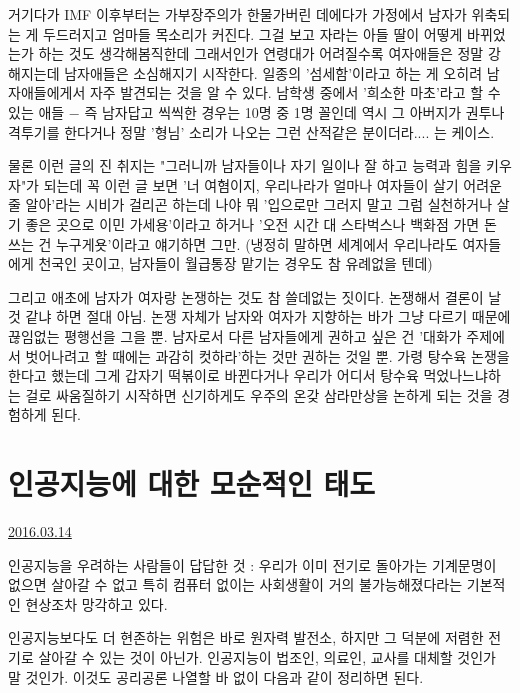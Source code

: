 거기다가 IMF 이후부터는 가부장주의가 한물가버린 데에다가 가정에서 남자가 위축되는 게 두드러지고 엄마들 목소리가 커진다.
그걸 보고 자라는 아들 딸이 어떻게 바뀌었는가 하는 것도 생각해봄직한데
그래서인가 연령대가 어려질수록 여자애들은 정말 강해지는데 남자애들은 소심해지기 시작한다.
일종의 '섬세함'이라고 하는 게 오히려 남자애들에게서 자주 발견되는 것을 알 수 있다.
남학생 중에서 '희소한 마초'라고 할 수 있는 애들 $-$ 즉 남자답고 씩씩한 경우는 10명 중 1명 꼴인데
역시 그 아버지가 권투나 격투기를 한다거나 정말 '형님' 소리가 나오는 그런 산적같은 분이더라.... 는 케이스.
\vspace{5mm}

물론 이런 글의 진 취지는 "그러니까 남자들이나 자기 일이나 잘 하고 능력과 힘을 키우자"가 되는데
꼭 이런 글 보면 '너 여혐이지, 우리나라가 얼마나 여자들이 살기 어려운 줄 알아'라는 시비가 걸리곤 하는데
나야 뭐 '입으로만 그러지 말고 그럼 실천하거나 살기 좋은 곳으로 이민 가세용'이라고 하거나
'오전 시간 대 스타벅스나 백화점 가면 돈 쓰는 건 누구게욧'이라고 얘기하면 그만.
(냉정히 말하면 세계에서 우리나라도 여자들에게 천국인 곳이고, 남자들이 월급통장 맡기는 경우도 참 유례없을 텐데)
\vspace{5mm}

그리고 애초에 남자가 여자랑 논쟁하는 것도 참 쓸데없는 짓이다. 논쟁해서 결론이 날 것 같냐 하면 절대 아님.
논쟁 자체가 남자와 여자가 지향하는 바가 그냥 다르기 때문에 끊임없는 평행선을 그을 뿐.
남자로서 다른 남자들에게 권하고 싶은 건 '대화가 주제에서 벗어나려고 할 때에는 과감히 컷하라'하는 것만 권하는 것일 뿐.
가령 탕수육 논쟁을 한다고 했는데 그게 갑자기 떡볶이로 바뀐다거나 우리가 어디서 탕수육 먹었나느냐하는 걸로 싸움질하기 시작하면
신기하게도 우주의 온갖 삼라만상을 논하게 되는 것을 경험하게 된다.
\vspace{5mm}



\section{인공지능에 대한 모순적인 태도}
\href{https://www.kockoc.com/Apoc/675934}{2016.03.14}

\vspace{5mm}

인공지능을 우려하는 사람들이 답답한 것 :
우리가 이미 전기로 돌아가는 기계문명이 없으면 살아갈 수 없고
특히 컴퓨터 없이는 사회생활이 거의 불가능해졌다라는 기본적인 현상조차 망각하고 있다.
\vspace{5mm}

인공지능보다도 더 현존하는 위험은 바로 원자력 발전소, 하지만 그 덕분에 저렴한 전기로 살아갈 수 있는 것이 아닌가.
인공지능이 법조인, 의료인, 교사를 대체할 것인가 말 것인가. 이것도 공리공론 나열할 바 없이 다음과 같이 정리하면 된다.
\vspace{5mm}

